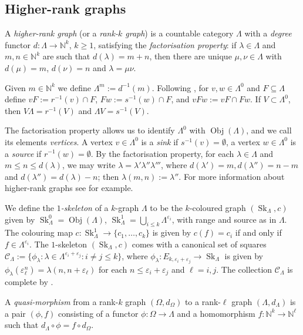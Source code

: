 \documentclass[12pt]{amsart}
\newcommand{\Obj}{\operatorname{Obj}}
\theoremstyle{definition}
\theoremstyle{remark}
\numberwithin{equation}{section}
\newcommand{\NN}{\mathbb{N}}
\newcommand{\Cc}{\mathcal{C}}
\newcommand{\Sk}{\operatorname{Sk}}
\begin{document}
\subsection{Higher-rank graphs}

A \emph{higher-rank graph} (or a \emph{rank-$k$ graph}) is a countable category $\Lambda$ with a \emph{degree} functor $d:\Lambda \to \NN^k$, $k \ge 1$, satisfying the \emph{factorisation property}: if $\lambda\in\Lambda$ and $m,n\in\NN^k$ are such that $d(\lambda)=m+n$, then there are unique $\mu,\nu \in \Lambda$ with $d(\mu)=m$, $d(\nu)=n$ and $\lambda=\mu\nu$. 

Given $m \in \NN^k$ we define $\Lambda^m := d^{-1}(m)$. Following \cite{PQR1}, for $v,w \in \Lambda^0$ and $F \subseteq \Lambda$ define $vF := r^{-1}(v) \cap F$, $Fw := s^{-1}(w) \cap F$, and $vFw := vF \cap Fw$. If $V \subset \Lambda^0$, then $V\Lambda = r^{-1} (V)$ and $\Lambda V = s^{-1} (V)$.

The factorisation property allows us to identify $\Lambda^0$ with $\operatorname{Obj}(\Lambda)$, and we call its elements \emph{vertices}. A vertex $v \in \Lambda^0$ is a \emph{sink} if $s^{-1} (v) = \emptyset$, a vertex $w \in \Lambda^0$ is a \emph{source} if $r^{-1} (w) = \emptyset$. By the factorisation property, for each $\lambda\in\Lambda$ and $m \leq n \leq d(\lambda)$, we may write $\lambda=\lambda'\lambda''\lambda'''$, where $d(\lambda')=m, d(\lambda'') = n-m$ and $d(\lambda'')=d(\lambda)-n$; then $\lambda (m,n) :=\lambda''$. For more information about higher-rank graphs see \cite{KP1,RSY1} for example.

We define the \emph{$1$-skeleton} of a $k$-graph $\Lambda$ to be the $k$-coloured graph $(\Sk_\Lambda,c)$ given by $\Sk_\Lambda^0 = \Obj(\Lambda)$, $\Sk_\Lambda^1 = \bigcup_{i\leq k}\Lambda^{\varepsilon_i}$, with range and source as in $\Lambda$. The colouring map $c : \Sk_\Lambda^1 \to \{c_1,\dots,c_k\}$ is given by $c(f) = c_i$ if and only if $f \in \Lambda^{\varepsilon_i}$. The $1$-skeleton $(\Sk_\Lambda,c)$ comes with a canonical set of squares $\Cc_\Lambda := \{\phi_\lambda : \lambda \in \Lambda^{\varepsilon_i+\varepsilon_j}: i \neq j \leq k  \}$, where $\phi_\lambda : E_{k,\varepsilon_i+\varepsilon_j} \to \Sk_\Lambda$ is given by $\phi_\lambda(\varepsilon_\ell^{n}) = \lambda(n,n+\varepsilon_\ell)$ for each $n \leq \varepsilon_i+\varepsilon_j$ and $\ell = i,j$. The collection $\Cc_\Lambda$ is complete by \cite[Lemma 4.2]{hrsw}.

A \emph{quasi-morphism} from a rank-$k$ graph $( \Omega , d_\Omega )$ to a rank-$\ell$ graph $( \Lambda , d_\Lambda )$ is a pair $( \phi , f)$ consisting of a functor $\phi : \Omega \to \Lambda$ and a homomorphism $f: \NN^k \to \NN^\ell$ such that $d_\Lambda \circ \phi = f \circ d_\Omega$. 
\end{document}
